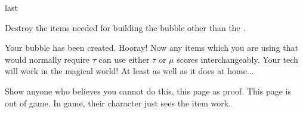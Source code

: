 \documentclass[greennotebook]{guildcamp3} %
\begin{document}
\begin{page}[at last...]{last}
	
Destroy the items needed for building the bubble other than the \iScrewdriver{}.

Your bubble has been created. Hooray! Now any items which you are using that would normally require $\tau$ can use either $\tau$ or $\mu$ scores interchangeably. Your tech will work in the magical world! At least as well as it does at home... 

Show anyone who believes you cannot do this, this page as proof. This page is out of game. In game, their character just sees the item work. 


\end{page}



\endnotebook
\end{document}
